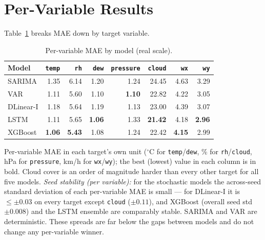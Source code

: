 \documentclass[12pt,a4paper,oneside]{report}
\begin{document}
\section{Per-Variable Results}
\label{sec:per-var-results}
Table~\ref{tab:per-variable} breaks MAE down by target variable.

\begin{table}[H]
\centering
\caption{Per-variable MAE by model (real scale).}
\label{tab:per-variable}
\begin{tabular}{lrrrrrrr}
\toprule
\textbf{Model} & \texttt{temp} & \texttt{rh} & \texttt{dew} & \texttt{pressure} & \texttt{cloud} & \texttt{wx} & \texttt{wy} \\
\midrule
SARIMA    & 1.35 & 6.14 & 1.20 & 1.24 & 24.45 & 4.63 & 3.29 \\
VAR       & 1.11 & 5.60 & 1.10 & \textbf{1.10} & 22.82 & 4.22 & 3.05 \\
DLinear-I & 1.18 & 5.64 & 1.19 & 1.13 & 23.00 & 4.39 & 3.07 \\
LSTM      & 1.11 & 5.65 & \textbf{1.06} & 1.33 & \textbf{21.42} & 4.18 & \textbf{2.96} \\
XGBoost   & \textbf{1.06} & \textbf{5.43} & 1.08 & 1.24 & 22.42 & \textbf{4.15} & 2.99 \\
\bottomrule
\end{tabular}
\end{table}

\noindent\footnotesize Per-variable MAE in each target's own unit
($^\circ$C for \texttt{temp}/\texttt{dew}, \% for \texttt{rh}/\texttt{cloud},
hPa for \texttt{pressure}, km/h for \texttt{wx}/\texttt{wy}); the best (lowest)
value in each column is in bold. Cloud cover is an order of magnitude harder than
every other target for all five models.
\emph{Seed stability (per variable):} for the stochastic models the across-seed
standard deviation of each per-variable MAE is small --- for DLinear-I it is
$\le\pm0.03$ on every target except \texttt{cloud} ($\pm0.11$), and XGBoost
(overall seed std $\pm0.008$) and the LSTM ensemble are comparably stable. SARIMA
and VAR are deterministic. These spreads are far below the gaps between models and
do not change any per-variable winner.\normalsize
\end{document}
